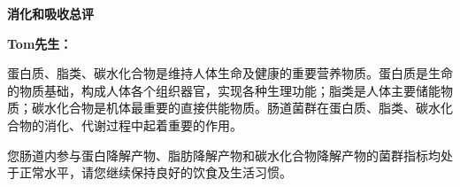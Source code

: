 

\usepackage{graphicx}
\graphicspath{{cores/}}



\setlength{\arrayrulewidth}{0.5pt}
\fontsize{9.3pt}{17pt}\selectfont
\color{gray2}

\vspace*{0mm}
\begin{center}
{\bf\sanhao 消化和吸收总评}
\end{center}

\medskip

\noindent
{\bf\xiaosihao Tom先生：}


\bigskip

蛋白质、脂类、碳水化合物是维持人体生命及健康的重要营养物质。蛋白质是生命的物质基础，构成人体各个组织器官，实现各种生理功能；脂类是人体主要储能物质；碳水化合物是机体最重要的直接供能物质。肠道菌群在蛋白质、脂类、碳水化合物的消化、代谢过程中起着重要的作用。

您肠道内参与蛋白降解产物、脂肪降解产物和碳水化合物降解产物的菌群指标均处于正常水平，请您继续保持良好的饮食及生活习惯。

